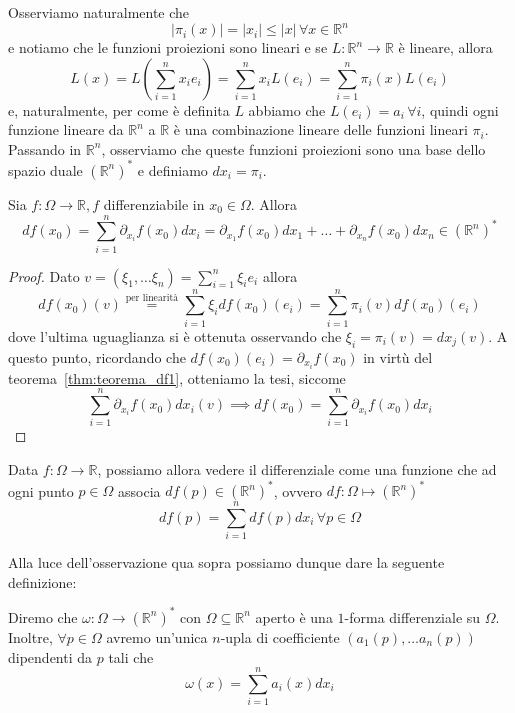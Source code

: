 Osserviamo naturalmente che
$$
|\pi_i(x)| = |x_i| \leq |x| \, \forall x \in \mathbb{R}^n
$$ 
e notiamo che le funzioni proiezioni sono lineari e se $L: \mathbb{R}^n \to \mathbb{R}$ è lineare, allora
$$
L(x) = L \left( \sum_{i=1}^n x_i e_i \right) = \sum_{i=1}^n x_i L(e_i) = \sum_{i=1}^n \pi_i(x) L(e_i)
$$
e, naturalmente, per come è definita $L$ abbiamo che $L(e_i) = a_i \, \forall i$, quindi ogni funzione lineare da $\mathbb{R}^n$ a $\mathbb{R}$ è una combinazione lineare delle funzioni lineari $\pi_i$. \\
Passando in $\mathbb{R}^n$, osserviamo che queste funzioni proiezioni sono una base dello spazio duale $(\mathbb{R}^n)^{*}$ e definiamo $dx_i = \pi_i$. \\
\begin{prop}
Sia $f: \Omega \to \mathbb{R}, f$ differenziabile in $x_0 \in \Omega$. Allora
$$
df(x_0) = \sum_{i=1}^n \partial_{x_i} f(x_0)dx_i = \partial_{x_1} f(x_0)dx_1 + \ldots + \partial_{x_n} f(x_0)dx_n \in (\mathbb{R}^n)^{*}
$$
\end{prop}
\begin{proof}
Dato $v=(\xi_1, \ldots \xi_n) = \sum_{i=1}^n \xi_i e_i$ allora
$$
df(x_0)(v) \stackrel{\text{per linearità}}{=} \sum_{i=1}^n \xi_i df(x_0)(e_i) = \sum_{i=1}^n \pi_i(v) df(x_0)(e_i)$$
dove l'ultima uguaglianza si è ottenuta osservando che $\xi_i = \pi_i(v) = dx_j(v)$. A questo punto, ricordando che $df(x_0)(e_i) = \partial_{x_i} f(x_0)$ in virtù del teorema~\ref{thm:teorema_df1}, otteniamo la tesi, siccome
$$\sum_{i=1}^n \partial_{x_i} f(x_0) dx_i(v) \implies df(x_0) = \sum_{i=1}^n \partial_{x_i} f(x_0) dx_i
$$
\end{proof}
\begin{remark}
Data $f: \Omega \to \mathbb{R}$, possiamo allora vedere il differenziale come una funzione che ad ogni punto $p \in \Omega$ associa $df(p) \in (\mathbb{R}^n)^{*}$, ovvero $df: \Omega \mapsto (\mathbb{R}^n)^{*}$
$$
df(p) = \sum_{i=1}^n df(p)dx_i \, \forall p \in \Omega
$$
\end{remark}
Alla luce dell'osservazione qua sopra possiamo dunque dare la seguente definizione:
\begin{definition}
Diremo che $\omega: \Omega \to (\mathbb{R}^n)^{*}$ con $\Omega \subseteq \mathbb{R}^n$ aperto è una $1$-forma differenziale su $\Omega$. Inoltre, $\forall p \in \Omega$ avremo un'unica $n$-upla di coefficiente $(a_1(p), \ldots a_n(p))$ dipendenti da $p$ tali che
$$
\omega(x) = \sum_{i=1}^n a_i(x)dx_i
$$
\end{definition}
